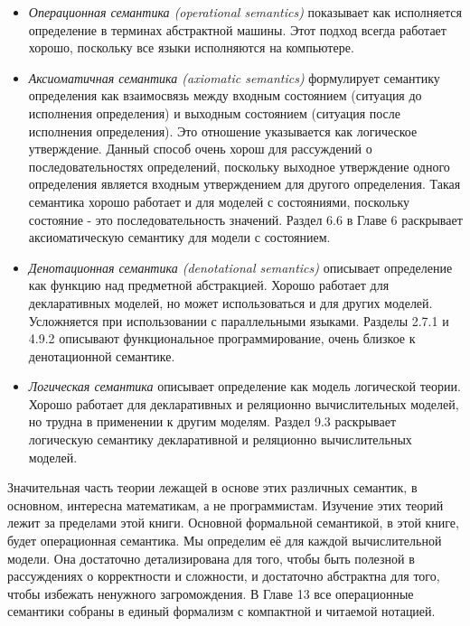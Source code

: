 \begin{itemize}
\item{\emph{Операционная семантика (operational semantics)} показывает как исполняется определение в терминах абстрактной машины. Этот подход всегда работает хорошо, поскольку все языки исполняются на компьютере.}

\item{\emph{Аксиоматичная семантика (axiomatic semantics)} формулирует семантику определения как взаимосвязь между входным состоянием (ситуация до исполнения определения) и выходным состоянием (ситуация после исполнения определения). Это отношение указывается как логическое утверждение. Данный способ очень хорош для рассуждений о последовательностях определений, поскольку выходное утверждение одного определения является входным утверждением для другого определения. Такая семантика хорошо работает и для моделей с состояниями, поскольку состояние - это последовательность значений. Раздел 6.6 в Главе 6 раскрывает аксиоматическую семантику для модели с состоянием.}

\item{\emph{Денотационная семантика (denotational semantics)} описывает определение как функцию над предметной абстракцией. Хорошо работает для декларативных моделей, но может использоваться и для других моделей. Усложняется при использовании с параллельными языками. Разделы 2.7.1 и 4.9.2 описывают функциональное программирование, очень близкое к денотационной семантике.}

\item{\emph{Логическая семантика} описывает определение как модель логической теории. Хорошо работает для декларативных и реляционно вычислительных моделей, но трудна в применении к другим моделям. Раздел 9.3 раскрывает логическую семантику декларативной и реляционно вычислительных моделей.}
\end{itemize}

Значительная часть теории лежащей в основе этих различных семантик, в основном, интересна математикам, а не программистам. Изучение этих теорий лежит за пределами этой книги. Основной формальной семантикой, в этой книге, будет операционная семантика. Мы определим её для каждой вычислительной модели. Она достаточно детализирована для того, чтобы быть полезной в рассуждениях о корректности и сложности, и достаточно абстрактна для того, чтобы избежать ненужного загромождения. В Главе 13 все операционные семантики собраны в единый формализм с компактной и читаемой нотацией.

